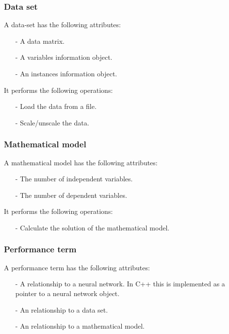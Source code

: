 \subsubsection*{Data set}

A data-set has the following attributes:

\begin{itemize}
\item[-] A data matrix.
\item[-] A variables information object. 
\item[-] An instances information object.
\end{itemize}

It performs the following operations:

\begin{itemize}
\item[-] Load the data from a file.
\item[-] Scale/unscale the data.
\end{itemize}

\subsubsection*{Mathematical model}

A mathematical model has the following attributes:

\begin{itemize}
\item[-] The number of independent variables.
\item[-] The number of dependent variables.
\end{itemize}

It performs the following operations:

\begin{itemize}
\item[-] Calculate the solution of the mathematical model.
\end{itemize}

\subsubsection*{Performance term}

A performance term has the following attributes:

\begin{itemize}
\item[-] A relationship to a neural network. In C++ this is implemented as a pointer to a neural network object.
\item[-] An relationship to a data set.
\item[-] An relationship to a mathematical model.
\end{itemize}

